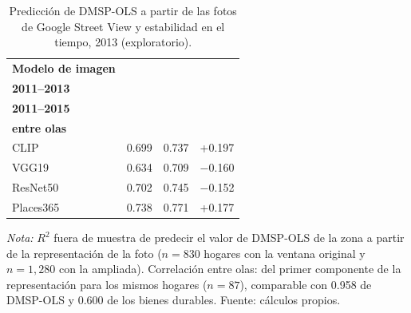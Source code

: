 \begin{table}[H]
  \centering
  \caption{Predicción de DMSP-OLS a partir de las fotos de Google Street View y estabilidad en el tiempo, 2013 (exploratorio).}
  \label{tab:gsv_prediccion_luz}
  \footnotesize
  \setlength{\tabcolsep}{6pt}
  \begin{tabular}{lccc}
    \toprule
    \textbf{Modelo de imagen} & \shortstack{\textbf{$R^2$, ventana}\\\textbf{2011--2013}} & \shortstack{\textbf{$R^2$, ventana}\\\textbf{2011--2015}} & \shortstack{\textbf{Correlación}\\\textbf{entre olas}} \\
    \midrule
    CLIP & 0.699 & 0.737 & +0.197 \\
    VGG19 & 0.634 & 0.709 & $-$0.160 \\
    ResNet50 & 0.702 & 0.745 & $-$0.152 \\
    Places365 & 0.738 & 0.771 & +0.177 \\
    \bottomrule
  \end{tabular}
  \begin{minipage}{0.95\textwidth}
    \vspace{4pt}
    \footnotesize \textit{Nota:} $R^2$ fuera de muestra de predecir el valor de DMSP-OLS de la zona a partir de la representación de la foto ($n=830$ hogares con la ventana original y $n=1{,}280$ con la ampliada). Correlación entre olas: del primer componente de la representación para los mismos hogares ($n=87$), comparable con 0.958 de DMSP-OLS y 0.600 de los bienes durables. Fuente: cálculos propios.
  \end{minipage}
\end{table}
